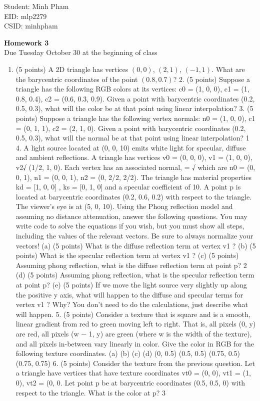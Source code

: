 \documentclass[12pt]{letter}
\begin{document}
\begin{center}
	Student: Minh Pham \\
	EID: mlp2279 \\
	CSID: minhpham
\end{center}

\begin{center}
	\textbf{Homework 3} \\
	Due Tuesday October 30 at the beginning of class
\end{center}

\begin{enumerate}
	\item (5 points)
	A 2D triangle has vertices $(0, 0)$, $(2, 1)$, $(−1, 1)$.
	What are the barycentric coordinates of the point $(0.8, 0.7)$?
2. (5 points) Suppose a triangle has the following RGB colors at its vertices: c0 = (1, 0, 0), c1 =
(1, 0.8, 0.4), c2 = (0.6, 0.3, 0.9). Given a point with barycentric coordinates (0.2, 0.5, 0.3), what will
the color be at that point using linear interpolation?
3. (5 points) Suppose a triangle has the following vertex normals: n0 = (1, 0, 0), c1 = (0, 1, 1), c2 = (2, 1, 0).
Given a point with barycentric coordinates (0.2, 0.5, 0.3), what will the normal be at that point using
linear interpolation?
1
4. A light source located at (0, 0, 10) emits white light for specular, diffuse and ambient reflections. A
triangle has vertices v0 = (0, 0, 0), v1 = (1, 0, 0), v2√ (1/2, 1, 0). Each vertex has an associated normal,
=
√
which are n0 = (0, 0, 1), n1 = (0, 0, 1), n2 = (0, 2/2, 2/2). The triangle has material properties
kd = [1, 0, 0] , ks = [0, 1, 0] and a specular coefficient of 10. A point p is located at barycentric
coordinates (0.2, 0.6, 0.2) with respect to the triangle. The viewer’s eye is at (5, 0, 10). Using the
Phong reflection model and assuming no distance attenuation, answer the following questions. You
may write code to solve the equations if you wish, but you must show all steps, including the values
of the relevant vectors. Be sure to always normalize your vectors!
(a) (5 points) What is the diffuse reflection term at vertex v1 ?
(b) (5 points) What is the specular reflection term at vertex v1 ?
(c) (5 points) Assuming phong reflection, what is the diffuse reflection term at point p?
2
(d) (5 points) Assuming phong reflection, what is the specular reflection term at point p?
(e) (5 points) If we move the light source very slightly up along the positive y axis, what will happen
to the diffuse and specular terms for vertex v1 ? Why? You don’t need to do the calculations, just
describe what will happen.
5. (5 points) Consider a texture that is square and is a smooth, linear gradient from red to green moving
left to right. That is, all pixels (0, y) are red, all pixels (w − 1, y) are green (where w is the width of
the texture), and all pixels in-between vary linearly in color. Give the color in RGB for the following
texture coordinates.
(a)
(b)
(c)
(d)
(0, 0.5)
(0.5, 0.5)
(0.75, 0.5)
(0.75, 0.75)
6. (5 points) Consider the texture from the previous question. Let a triangle have vertices that have
texture coordinates vt0 = (0, 0), vt1 = (1, 0), vt2 = (0, 0. Let point p be at barycentric coordinates
(0.5, 0.5, 0) with respect to the triangle. What is the color at p?
3
\end{enumerate}
\end{document}
